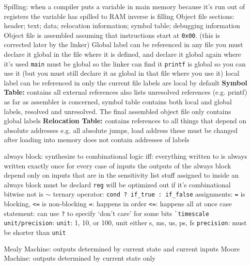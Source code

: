 \documentclass[12pt]{article}
\begin{document}
\begin{spacing}{0.9}
\begin{multicols*}{2}
\begin{flushleft}
\begin{outline}[longenum]
  \1 Spilling: when a compiler puts a variable in main memory because it's run out of registers
    \2 the variable has spilled to RAM
    \2 inverse is filling
  \1 Object file sections: header; text; data; relocation information; symbol table; debugging information
    \2 Object file is assembled assuming that instructions start at \verb|0x00|. (this is corrected later by the linker)
  \1 Global label can be referenced in any file
    \2 you must declare it global in the file where it is defined, and declare it global again where it's used
    \2 \verb|main| must be global so the linker can find it
    \2 \verb|printf| is global so you can use it (but you must still declare it as global in that file where you use it)
  \1 local label can be referenced in only the current file
    \2 labels are local by default
  \1 \textbf{Symbol Table:} contains all external references
    \2 also lists unresolved references (e.g. printf)
    \2 as far as assembler is concerned, symbol table contains both local and global labels, resolved and unresolved.
    \2 The final assembled object file only contains global labels
  \1 \textbf{Relocation Table:} contains references to all things that depend on absolute addresses
    \2 e.g. all absolute jumps, load address
    \2 these must be changed after loading into memory
    \2 does not contain addresses of labels



  \1 always block: synthesize to combinational logic iff:
    \2 everything written to is always written exactly once for every case of inputs
    \2 the outputs of the always block depend only on inputs that are in the sensitivity list
    \2 stuff assigned to inside an always block must be declard \verb|reg|
      \3 will be optimized out if it's combinational
  \1 bitwise not is $\sim$
  \1 ternary operator: \verb|cond ? if_true : if_false|
  \1 assignments: \verb|=| is blocking, \verb|<=| is non-blocking
    \2 \verb|=|: happens in order
    \2 \verb|<=|: happens all at once
  \1 case statement: can use \verb|?| to specify `don't care' for some bits
  \1 \verb|`timescale unit/precision|:
    \2 \verb|unit|: 1, 10, or 100, unit either s, ms, us, ps, fs
    \2 \verb|precision|: must be shorter than \verb|unit|

  \1 Mealy Machine: outputs determined by current state and current inputs
  \1 Moore Machine: outputs determined by current state only


\end{outline}
\end{flushleft}
\end{multicols*}
\end{spacing}
\end{document}
